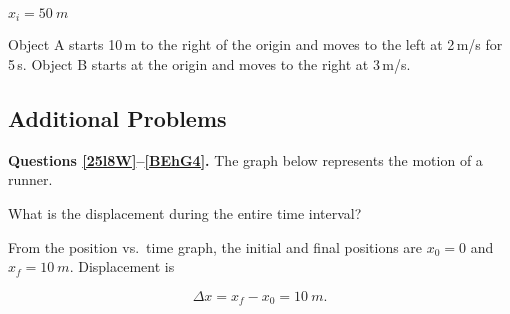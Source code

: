 \documentclass[dvipsnames]{exam}
\begin{document}
\begin{questions}
$x_i = \SI{50}{m}$

\question
Object A starts 10\,m to the right of the origin and moves to the left at 2\,m/s for 5\,s. 
Object B starts at the origin and moves to the right at 3\,m/s.


\question \label{TDX9e}
\phantom{.}

\begin{center}
\end{center}

\clearpage
\subsection*{Additional Problems}


\textbf{Questions \ref{25l8W}--\ref{BEhG4}.} The graph below represents the motion of a runner.

\begin{center}
\end{center}


\question \label{25l8W}
What is the displacement during the entire time interval?

\begin{solution}
From the position vs.~time graph, the initial and final positions are $x_0=0$ and $x_f = \SI{10}{m}$. Displacement is

\begin{equation*}
    \Delta{x} = x_f - x_0 = \SI{10}{m}.
\end{equation*}
\end{solution}


\end{questions}
\end{document}
